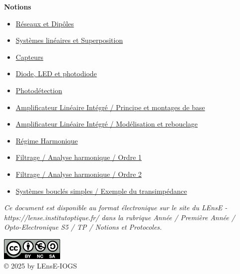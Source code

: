 \documentclass[a4paper,11pt,twoside]{book} %
\begin{document}
\begin{titlepage}
\begin{center}
\medskip


{\large \textbf{Notions}}

\begin{itemize}[label=$\blacktriangleright$]
	\item \hyperref[fiche:Bases1]{Réseaux et Dipôles}
	\item \hyperref[fiche:Bases2]{Systèmes linéaires et Superposition}
	\item \hyperref[fiche:Capteurs]{Capteurs}
	\item \hyperref[fiche:LED]{Diode, LED et photodiode}
	\item \hyperref[fiche:Photodetection]{Photodétection}
	\item \hyperref[fiche:ALI]{Amplificateur Linéaire Intégré / Principe et montages de base}
	\item \hyperref[fiche:ALIModele]{Amplificateur Linéaire Intégré / Modélisation et rebouclage}
	\item \hyperref[fiche:RegimeHarmonique]{Régime Harmonique}
	\item \hyperref[fiche:AnHaOrdre1]{Filtrage / Analyse harmonique / Ordre 1}
	\item \hyperref[fiche:AnHaOrdre2]{Filtrage / Analyse harmonique / Ordre 2}	
	\item \hyperref[fiche:ModeleTransimpedance]{Systèmes bouclés simples / Exemple du transimpédance}
	
\end{itemize}


\bigskip

\textit{Ce document est disponible au format électronique sur le site du LEnsE - https://lense.institutoptique.fr/ dans la rubrique Année / Première Année / Opto-Electronique S5 / TP / Notions et Protocoles.}

\medskip

\begin{minipage}{5cm}
\begin{center}
\includegraphics[width=3cm]{./images/logocc}\\
\small
  © 2025 by LEnsE-IOGS 
\end{center}
\end{minipage}


\end{center}
\end{titlepage}
\end{document}
